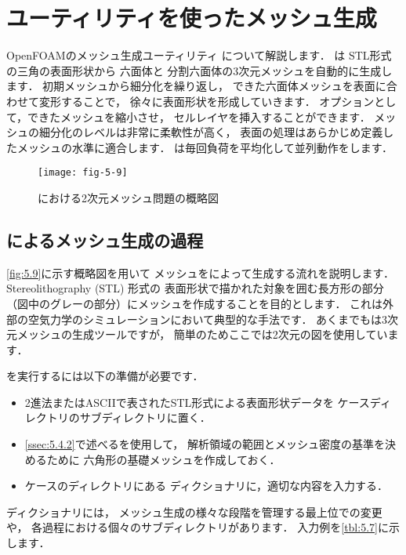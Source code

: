 \section{ユーティリティを使ったメッシュ生成}
\label{sec:5.4}
%
%
%
OpenFOAMのメッシュ生成ユーティリティ
について解説します．
は
%
STL形式の三角の表面形状から
六面体と
%
分割六面体の3次元メッシュを自動的に生成します．
初期メッシュから細分化を繰り返し，
できた六面体メッシュを表面に合わせて変形することで，
徐々に表面形状を形成していきます．
オプションとして，できたメッシュを縮小させ，
セルレイヤを挿入することができます．
メッシュの細分化のレベルは非常に柔軟性が高く，
表面の処理はあらかじめ定義したメッシュの水準に適合します．
は毎回負荷を平均化して並列動作をします．


\begin{figure}[ht]
 \texttt{[image: fig-5-9]}
 \caption{における2次元メッシュ問題の概略図}
 \label{fig:5.9}
\end{figure}


\subsection{によるメッシュ生成の過程}
\label{ssec:5.4.1}
\autoref{fig:5.9}に示す概略図を用いて
メッシュをによって生成する流れを説明します．
%
Stereolithography (STL) 形式の
%
%
表面形状で描かれた対象を囲む長方形の部分
（図中のグレーの部分）にメッシュを作成することを目的とします．
これは外部の空気力学のシミュレーションにおいて典型的な手法です．
あくまでもは3次元メッシュの生成ツールですが，
簡単のためここでは2次元の図を使用しています．

を実行するには以下の準備が必要です．
\begin{itemize}
 \item 2進法またはASCIIで表されたSTL形式による表面形状データを
       ケースディレクトリのサブディレクトリに置く．
 \item \autoref{ssec:5.4.2}で述べるを使用して，
       解析領域の範囲とメッシュ密度の基準を決めるために
       六角形の基礎メッシュを作成しておく．
 \item ケースのディレクトリにある
%
%
       ディクショナリに，適切な内容を入力する．
\end{itemize}
ディクショナリには，
%
メッシュ生成の様々な段階を管理する最上位での変更や，
各過程における個々のサブディレクトリがあります．
入力例を\autoref{tbl:5.7}に示します．


